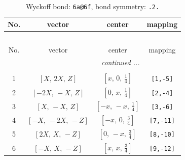 \documentclass[fleqn,8pt]{jsarticle}
\begin{document}
\begin{longtable}{cccc}
\caption{Wyckoff bond: {\tt 6a@6f}, bond symmetry: {\tt .2.}}
 \\
 \hline \hline
No. & vector & center & mapping \\ \hline \endfirsthead

\multicolumn{3}{l}{\tablename\ \thetable{}} \\
 \hline \hline
No. & vector & center & mapping \\ \hline \endhead

 \hline \hline
\multicolumn{3}{r}{\footnotesize\it continued ...} \\ \endfoot

 \hline \hline
\multicolumn{3}{r}{} \\ \endlastfoot

1 & $\left[ X,\, 2 X,\, Z \right]$ & $\left[ x,\, 0,\, \frac{1}{4} \right]$ & {\tt [1,-5]} \\ \hline
2 & $\left[ - 2 X,\, - X,\, Z \right]$ & $\left[ 0,\, x,\, \frac{1}{4} \right]$ & {\tt [2,-4]} \\ \hline
3 & $\left[ X,\, - X,\, Z \right]$ & $\left[ - x,\, - x,\, \frac{1}{4} \right]$ & {\tt [3,-6]} \\ \hline
4 & $\left[ - X,\, - 2 X,\, - Z \right]$ & $\left[ - x,\, 0,\, \frac{3}{4} \right]$ & {\tt [7,-11]} \\ \hline
5 & $\left[ 2 X,\, X,\, - Z \right]$ & $\left[ 0,\, - x,\, \frac{3}{4} \right]$ & {\tt [8,-10]} \\ \hline
6 & $\left[ - X,\, X,\, - Z \right]$ & $\left[ x,\, x,\, \frac{3}{4} \right]$ & {\tt [9,-12]} \\
\end{longtable}
\renewcommand{\arraystretch}{1.2}
\end{document}
